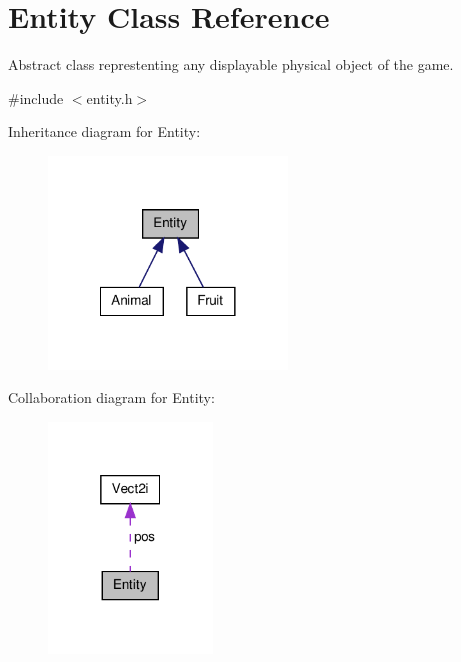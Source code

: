 \hypertarget{class_entity}{\section{Entity Class Reference}
\label{class_entity}
}


Abstract class represtenting any displayable physical object of the game.  




{\ttfamily \#include $<$entity.\-h$>$}



Inheritance diagram for Entity\-:\nopagebreak
\begin{figure}[H]
\begin{center}
\leavevmode
\includegraphics[width=180pt]{class_entity__inherit__graph}
\end{center}
\end{figure}


Collaboration diagram for Entity\-:
\nopagebreak
\begin{figure}[H]
\begin{center}
\leavevmode
\includegraphics[width=124pt]{class_entity__coll__graph}
\end{center}
\end{figure}
